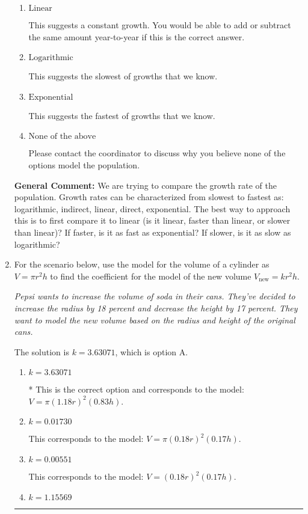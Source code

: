 \documentclass{extbook}[14pt]
\newcommand{\litem}[1]{\item #1

\rule{\textwidth}{0.4pt}}
\begin{document}
\begin{enumerate}
{\begin{enumerate}[label=\Alph*.]
This suggests a growth faster than constant but slower than exponential.
\item \( \text{Linear} \)

This suggests a constant growth. You would be able to add or subtract the same amount year-to-year if this is the correct answer.
\item \( \text{Logarithmic} \)

This suggests the slowest of growths that we know.
\item \( \text{Exponential} \)

This suggests the fastest of growths that we know.
\item \( \text{None of the above} \)

Please contact the coordinator to discuss why you believe none of the options model the population.
\end{enumerate}

\textbf{General Comment:} We are trying to compare the growth rate of the population. Growth rates can be characterized from slowest to fastest as: logarithmic, indirect, linear, direct, exponential. The best way to approach this is to first compare it to linear (is it linear, faster than linear, or slower than linear)? If faster, is it as fast as exponential? If slower, is it as slow as logarithmic?
}
\litem{
For the scenario below, use the model for the volume of a cylinder as $V = \pi r^2 h$ to find the coefficient for the model of the new volume $V_{\text{new}} = k r^2 h$.

\begin{center}
    \textit{ Pepsi wants to increase the volume of soda in their cans. They've decided to increase the radius by 18 percent and decrease the height by 17 percent. They want to model the new volume based on the radius and height of the original cans. }
\end{center}
The solution is \( k = 3.63071 \), which is option A.\begin{enumerate}[label=\Alph*.]
\item \( k = 3.63071 \)

* This is the correct option and corresponds to the model: $V = \pi (1.18 r)^2 (0.83 h)$.
\item \( k = 0.01730 \)

This corresponds to the model: $V = \pi (0.18 r)^2 (0.17 h)$.
\item \( k = 0.00551 \)

This corresponds to the model: $V = (0.18 r)^2 (0.17 h)$.
\item \( k = 1.15569 \)


\end{enumerate}}
\end{enumerate}
\end{document}
